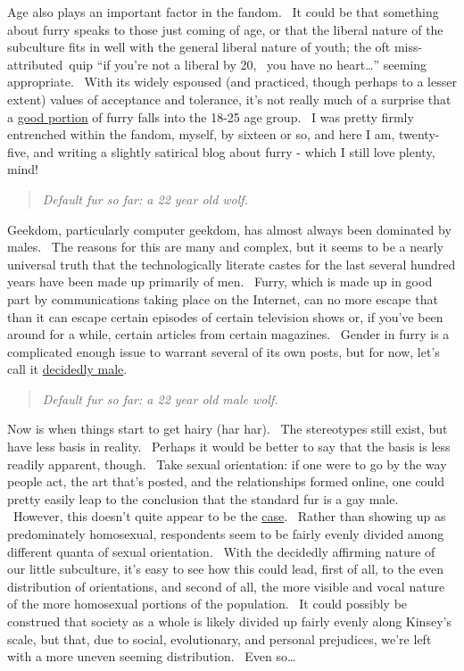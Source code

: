 Age also plays an important factor in the fandom. ~It could be that
something about furry speaks to those just coming of age, or that the
liberal nature of the subculture fits in well with the general liberal
nature of youth; the oft miss-attributed~quip ``if you're not a liberal
by 20, ~you have no heart\ldots{}'' seeming appropriate. ~With its
widely espoused (and practiced, though perhaps to a lesser extent)
values of acceptance and tolerance, it's not really much of a surprise
that a \href{http://vis.adjectivespecies.com/furrysurvey/age.shtml}{good
portion} of furry falls into the 18-25 age group. ~I was pretty firmly
entrenched within the fandom, myself, by sixteen or so, and here I am,
twenty-five, and writing a slightly satirical blog about furry - which I
still love plenty, mind!

\begin{quote}
\emph{Default fur so far: a 22 year old wolf.}
\end{quote}

Geekdom, particularly computer geekdom, has almost always been dominated
by males. ~The reasons for this are many and complex, but it seems to be
a nearly universal truth that the technologically literate castes for
the last several hundred years have been made up primarily of men.
~Furry, which is made up in good part by communications taking place on
the Internet, can no more escape that than it can escape certain
episodes of certain television shows or, if you've been around for a
while, certain articles from certain magazines. ~Gender in furry is a
complicated enough issue to warrant several of its own posts, but for
now, let's call it
\href{http://vis.adjectivespecies.com/furrysurvey/sexGender.shtml}{decidedly
male}.

\begin{quote}
\emph{Default fur so far: a 22 year old male wolf.}
\end{quote}

Now is when things start to get hairy (har har). ~The stereotypes still
exist, but have less basis in reality. ~Perhaps it would be better to
say that the basis is less readily apparent, though. ~Take sexual
orientation: if one were to go by the way people act, the art that's
posted, and the relationships formed online, one could pretty easily
leap to the conclusion that the standard fur is a gay male. ~However,
this doesn't quite appear to be the
\href{(http://vis.adjectivespecies.com/furrysurvey/orientation.shtml}{case}.
~Rather than showing up as predominately homosexual, respondents seem to
be fairly evenly divided among different quanta of sexual orientation.
~With the decidedly affirming nature of our little subculture, it's easy
to see how this could lead, first of all, to the even distribution of
orientations, and second of all, the more visible and vocal nature of
the more homosexual portions of the population. ~It could possibly be
construed that society as a whole is likely divided up fairly evenly
along Kinsey's scale, but that, due to social, evolutionary, and
personal prejudices, we're left with a more uneven seeming distribution.
~Even so\ldots{}


